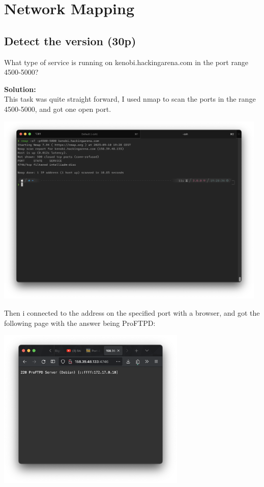 \newpage
\section{Network Mapping}

\subsection{Detect the version (30p)}
What type of service is running on kenobi.hackingarena.com in the port range 4500-5000?

\textbf{Solution:}\\
This task was quite straight forward, I used nmap to scan the ports in the range 4500-5000, and got one open port.

\begin{center}
    \includegraphics[width=13cm]{img/Network mapping/Detect the version/Skjermbilde 2023-09-10 kl. 19.31.32.png}
\end{center}

Then i connected to the address on the specified port with a browser, and got the following page with the answer being ProFTPD:

\begin{center}
    \includegraphics[width=9cm]{img/Network mapping/Detect the version/Skjermbilde 2023-09-10 kl. 19.31.52.png}
\end{center}
    

